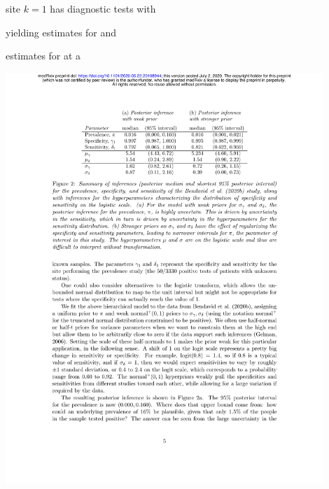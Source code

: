 \documentclass[9pt]{report}
\begin{document}
\vspace*{-12pt}
\begin{subitemize}
  \item site $k = 1$ has diagnostic tests with 
    \vspace*{-4pt}
  \item yielding estimates for  and
    \vspace*{-4pt}
  \item estimates for  at a 
\end{subitemize}
\qquad \includegraphics[width=0.9\textwidth]{img/results-table.pdf}
\vfill
\end{document}

